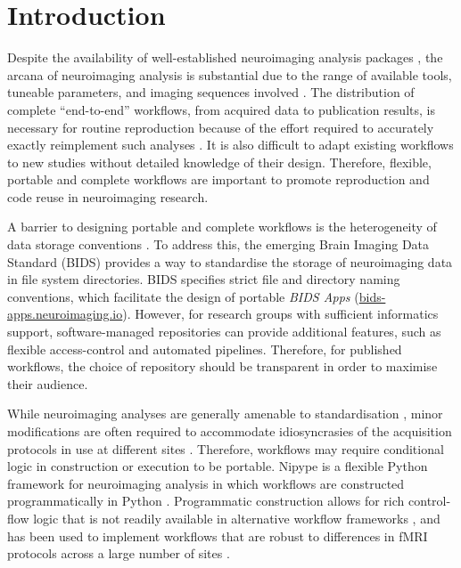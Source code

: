 \documentclass[smallextended]{svjour3}       %
\begin{document}
\section*{Introduction}
\label{intro}

Despite the availability of well-established neuroimaging analysis
packages \citep{cox_afni:_1996,smith_advances_2004,friston_statistical_2007,tournier_mrtrix:_2012},
the arcana of neuroimaging analysis is substantial due to
the range of available tools, tuneable parameters, and imaging sequences
involved \citep{cusack_automatic_2015}. The distribution of complete
``end-to-end'' workflows, from acquired data to publication results, is
necessary for routine reproduction because of the effort required to
accurately exactly reimplement such analyses \citep{kennedy_neuroimaging_2018}. It is also
difficult to adapt existing workflows to new studies without detailed
knowledge of their design. Therefore, flexible, portable and complete
workflows are important to promote reproduction and code reuse in
neuroimaging research.

A barrier to designing portable and complete workflows is the
heterogeneity of data storage conventions \citep{marcus_extensible_2007,das_loris:_2012,gorgolewski_brain_2016}.
To address this, the emerging Brain
Imaging Data Standard (BIDS) \citep{gorgolewski_brain_2016} provides a way
to standardise the storage of neuroimaging data in file system
directories. BIDS specifies strict file and directory naming
conventions, which facilitate the design of portable \emph{BIDS Apps}
(\url{bids-apps.neuroimaging.io}). However, for research groups with
sufficient informatics support, software-managed repositories \citep{marcus_extensible_2007,das_loris:_2012}
can provide additional features, such as
flexible access-control and automated pipelines. Therefore, for
published workflows, the choice of repository should be transparent in
order to maximise their audience.

While neuroimaging analyses are generally amenable to standardisation
\citep{kennedy_neuroimaging_2018}, minor modifications are often required to accommodate
idiosyncrasies of the acquisition protocols in use at different sites
\citep{esteban_fmriprep:_2018}. Therefore, workflows may require conditional
logic in construction or execution to be portable. Nipype is a flexible
Python framework for neuroimaging analysis in which workflows are
constructed programmatically in Python \citep{gorgolewski_nipype:_2011}.
Programmatic construction allows for rich control-flow logic that is not
readily available in alternative workflow frameworks \citep{cusack_automatic_2015,achterberg_fastr:_2016,amstutz_common_2016},
and has been used
to implement workflows that are robust to differences in fMRI protocols
across a large number of sites \citep{esteban_fmriprep:_2018}.
\end{document}
